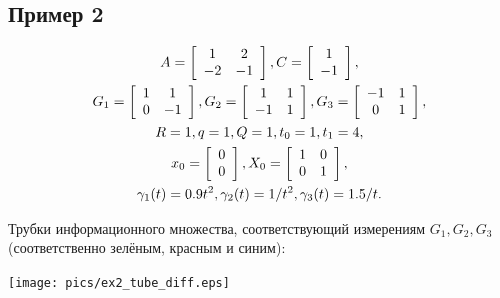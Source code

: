 \documentclass[12pt]{article}
\begin{document}
\subsection{Пример 2}
\begin{gather}
A = \left[ \begin{array}{cc}
1 & 2\\
-2 & -1
\end{array} \right],
C = \left[ \begin{array}{cc}
1 \\
-1
\end{array} \right], \notag \\
G_1 = \left[ \begin{array}{cc}
1 & 1\\
0 & -1
\end{array} \right],
G_2 = \left[ \begin{array}{cc}
1 & 1\\
-1 & 1
\end{array} \right],
G_3 = \left[ \begin{array}{cc}
-1 & 1\\
0 & 1
\end{array} \right], \notag\\
R = 1, q = 1, Q = 1, t_0 = 1, t_1 = 4, \notag\\
x_0 = \left[ \begin{array}{cc}
0\\
0
\end{array} \right],
X_0 = \left[ \begin{array}{cc}
1 & 0\\
0 & 1
\end{array} \right], \notag \\
\gamma_1(t) = 0.9 t^2, \gamma_2(t) = 1/t^2, \gamma_3(t) = 1.5/t. \notag
\end{gather}

Трубки информационного множества, соответствующий измерениям $G_1, G_2, G_3$ (соответственно зелёным, красным и синим):

\texttt{[image: pics/ex2\_tube\_diff.eps]}
\end{document}
